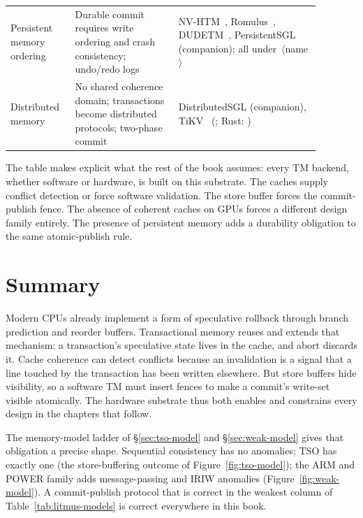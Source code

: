 \begin{table}[htbp]
\begin{tabular}{M{0.17\linewidth} M{0.30\linewidth} M{0.41\linewidth}}
Persistent memory ordering &
Durable commit requires write ordering and crash consistency; undo/redo logs &
NV-HTM~\cite{castro18nvhtm}, Romulus~\cite{correia18romulus}, DUDETM~\cite{liu17dudetm}, PersistentSGL (companion); all under \,$\langle$name$\rangle$ \\
Distributed memory &
No shared coherence domain; transactions become distributed protocols; two-phase commit &
DistributedSGL (companion), TiKV~\cite{peng10percolator} (; Rust: ) \\
\hline
\end{tabular}
\end{table}

The table makes explicit what the rest of the book assumes: every TM backend,
whether software or hardware, is built on this substrate. The caches supply
conflict detection or force software validation. The store buffer forces the
commit-publish fence. The absence of coherent caches on GPUs forces a
different design family entirely. The presence of persistent memory adds a
durability obligation to the same atomic-publish rule.

\section{Summary}

Modern CPUs already implement a form of speculative rollback through branch
prediction and reorder buffers. Transactional memory reuses and extends that
mechanism: a transaction's speculative state lives in the cache, and abort
discards it. Cache coherence can detect conflicts because an invalidation is
a signal that a line touched by the transaction has been written elsewhere.
But store buffers hide visibility, so a software TM must insert fences to make
a commit's write-set visible atomically. The hardware substrate thus both
enables and constrains every design in the chapters that follow.

The memory-model ladder of \S\ref{sec:tso-model} and \S\ref{sec:weak-model}
gives that obligation a precise shape.
Sequential consistency has no anomalies; TSO has exactly one (the
store-buffering outcome of Figure~\ref{fig:tso-model}); the ARM and POWER
family adds message-passing and IRIW anomalies (Figure~\ref{fig:weak-model}).
A commit-publish protocol that is correct in the weakest column of
Table~\ref{tab:litmus-models} is correct everywhere in this book.

